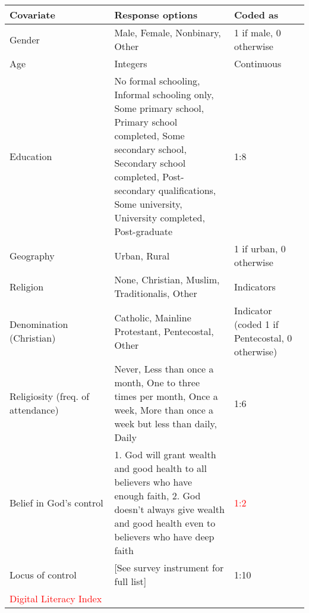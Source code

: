 \begin{table}[H]
\begin{tabular}{p{0.35\linewidth}p{0.4\linewidth}p{0.25\linewidth}}
\textbf{Covariate}                   & \textbf{Response options} & \textbf{Coded as}                                     \\
\hline
Gender                                      & Male,   Female, Nonbinary, Other                           & 1 if male, 0 otherwise  \\
Age                                         & Integers                                                   & Continuous              \\
Education &
  No   formal schooling, Informal schooling only, Some primary school, Primary   school completed, Some secondary school, Secondary school completed,   Post-secondary qualifications, Some university, University completed,   Post-graduate &
  1:8 \\
Geography                                   & Urban, Rural                                 & 1 if urban, 0 otherwise \\
Religion                                    & None,   Christian, Muslim, Traditionalis, Other                           & Indicators              \\
Denomination (Christian)  & Catholic, Mainline Protestant, Pentecostal, Other  & Indicator (coded 1 if Pentecostal, 0 otherwise)\\
Religiosity   (freq. of attendance) &
  Never,   Less than once a month, One to three times per month, Once a week, More than   once a week but less than daily, Daily &
  1:6 \\
 Belief in God's control & 1. God will grant wealth and good health to all believers who have enough faith, 2. God doesn't always give wealth and good health even to believers who have deep faith & \textcolor{red}{1:2}\\
 Locus of control & 
[See survey instrument for full list] & 1:10\\
\textcolor{red}{Digital Literacy Index }& & \\

\end{tabular}
\end{table}
